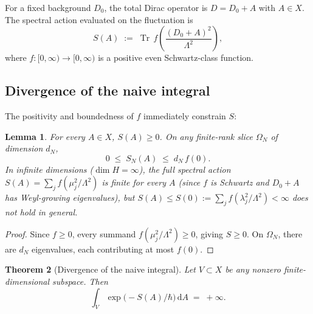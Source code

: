 \documentclass[12pt,a4paper]{article}
\theoremstyle{plain}
\newtheorem{theorem}{Theorem}[section]
\newtheorem{lemma}[theorem]{Lemma}
\theoremstyle{definition}
\theoremstyle{remark}
\newcommand{\dd}{\mathrm{d}}
\newcommand{\Tr}{\operatorname{Tr}}
\newcommand{\Lam}{\Lambda}
\begin{document}
For a fixed background $D_0$, the total Dirac operator is
$D = D_0 + A$ with $A \in X$.  The spectral action evaluated on
the fluctuation is
\begin{equation}\label{eq:SA-fluctuation}
  S(A) \;:=\; \Tr\, f\!\left(\frac{(D_0+A)^2}{\Lam^2}\right),
\end{equation}
where $f\colon [0,\infty) \to [0,\infty)$ is a positive even
Schwartz-class function.

\subsection{Divergence of the naive integral}

The positivity and boundedness of $f$ immediately constrain $S$:

\begin{lemma}\label{lem:bounded}
For every $A \in X$, $S(A) \ge 0$.  On any finite-rank
slice $\Omega_N$ of dimension $d_N$,
\begin{equation}
  0 \;\le\; S_N(A) \;\le\; d_N\,f(0).
\end{equation}
In infinite dimensions ($\dim H = \infty$), the full spectral action
$S(A) = \sum_j f(\mu_j^2/\Lam^2)$ is finite for every $A$ (since $f$
is Schwartz and $D_0 + A$ has Weyl-growing eigenvalues), but
$S(A) \le S(0) := \sum_j f(\lambda_j^2/\Lam^2) < \infty$ does
\emph{not} hold in general.
\end{lemma}

\begin{proof}
Since $f \ge 0$, every summand $f(\mu_j^2/\Lam^2) \ge 0$, giving
$S \ge 0$.  On $\Omega_N$, there are $d_N$ eigenvalues, each
contributing at most $f(0)$.
\end{proof}

\begin{theorem}[Divergence of the naive integral]
\label{thm:divergence}
Let $V \subset X$ be any nonzero finite-dimensional subspace.  Then
\begin{equation}
  \int_V \exp\!\bigl(-S(A)/\hbar\bigr)\,\dd A \;=\; +\infty.
\end{equation}
\end{theorem}
\end{document}
